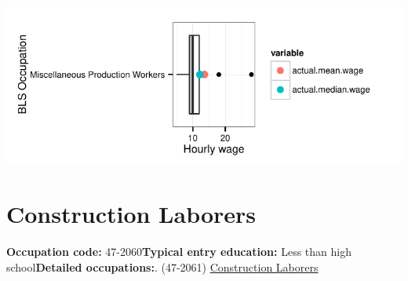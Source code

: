 \documentclass[a4paper,10pt]{article}\usepackage[]{graphicx}\usepackage[]{color}
\makeatletter
\def\maxwidth{ %
  \ifdim\Gin@nat@width>\linewidth
    \linewidth
  \else
    \Gin@nat@width
  \fi
}
\makeatother
\begin{document}
{\centering \includegraphics[width=\maxwidth]{figure/unnamed-chunk-235} 

}


\newpage\section{Construction Laborers}\textbf{Occupation code:} 47-2060\newline\textbf{Typical entry education:} Less than high school\newline\textbf{Detailed occupations:}. (47-2061)  \href{http://www.bls.gov/oes/current/oes472061.htm}{Construction Laborers}\newline%
\end{document}
